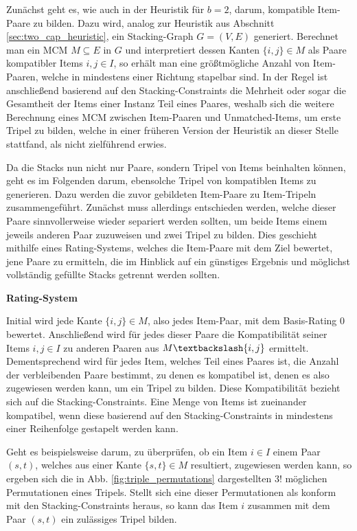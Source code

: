 Zunächst geht es, wie auch in der Heuristik für $b = 2$, darum, kompatible Item-Paare zu bilden.
Dazu wird, analog zur Heuristik aus Abschnitt \ref{sec:two_cap_heuristic}, ein Stacking-Graph $G = (V, E)$ generiert.
Berechnet man ein \textsc{MCM} $M \subseteq E$ in $G$ und interpretiert dessen Kanten $\{i, j\} \in M$ als Paare kompatibler Items $i, j \in I$, so erhält man eine größtmögliche Anzahl von Item-Paaren, welche in mindestens einer Richtung stapelbar sind.
In der Regel ist anschließend basierend auf den Stacking-Constraints die Mehrheit oder sogar die Gesamtheit der Items einer Instanz Teil eines Paares, weshalb sich die weitere Berechnung eines \textsc{MCM} zwischen Item-Paaren und Unmatched-Items,
um erste Tripel zu bilden, welche in einer früheren Version der Heuristik an dieser Stelle stattfand, als nicht zielführend
erwies.

Da die Stacks nun nicht nur Paare, sondern Tripel von Items beinhalten können, geht es im Folgenden darum,
ebensolche Tripel von kompatiblen Items zu generieren. Dazu werden die zuvor gebildeten Item-Paare zu Item-Tripeln zusammengeführt.
Zunächst muss allerdings entschieden werden, welche dieser Paare sinnvollerweise wieder separiert werden sollten,
um beide Items einem jeweils anderen Paar zuzuweisen und zwei Tripel zu bilden. Dies geschieht mithilfe eines Rating-Systems, welches die Item-Paare mit dem Ziel bewertet, jene Paare zu ermitteln, die im Hinblick auf ein günstiges Ergebnis
und möglichst vollständig gefüllte Stacks getrennt werden sollten.\newline

\textbf{Rating-System}

Initial wird jede Kante $\{i, j\} \in M$, also jedes Item-Paar, mit dem Basis-Rating $0$ bewertet.
Anschließend wird für jedes dieser Paare die Kompatibilität seiner Items $i, j \in I$ zu anderen Paaren aus $M \textbackslash \{i, j\}$ ermittelt.
Dementsprechend wird für jedes Item, welches Teil eines Paares ist, die Anzahl der verbleibenden Paare bestimmt, zu denen es kompatibel ist, denen es also zugewiesen werden kann, um ein Tripel zu bilden. Diese Kompatibilität bezieht sich auf die Stacking-Constraints.
Eine Menge von Items ist zueinander kompatibel, wenn diese basierend auf den Stacking-Constraints in mindestens einer
Reihenfolge gestapelt werden kann.

Geht es beispielsweise darum, zu überprüfen, ob ein Item $i \in I$ einem Paar $(s, t)$, welches aus einer Kante $\{s, t\} \in M$ resultiert,
zugewiesen werden kann, so ergeben sich die in Abb. \ref{fig:triple_permutations} dargestellten $3!$ möglichen Permutationen eines Tripels. Stellt sich eine dieser Permutationen als konform mit den Stacking-Constraints heraus, so kann das Item $i$ zusammen mit dem Paar $(s, t)$ ein zulässiges Tripel bilden.

